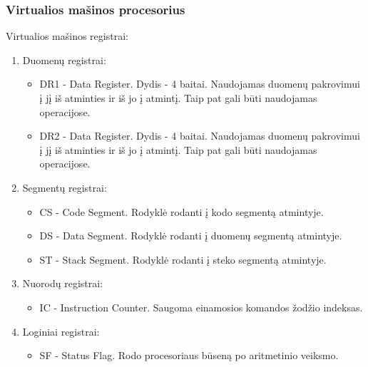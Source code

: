 	\subsubsection{Virtualios mašinos procesorius}
	Virtualios mašinos registrai:
	\begin{enumerate}
	\item Duomenų registrai: 
		\begin{itemize}
		\item DR1 - Data Register. Dydis - 4 baitai. Naudojamas duomenų pakrovimui į jį iš atminties ir iš jo į atmintį. Taip pat gali būti naudojamas operacijose.
		\item DR2 - Data Register. Dydis - 4 baitai. Naudojamas duomenų pakrovimui į jį iš atminties ir iš jo į atmintį. Taip pat gali būti naudojamas operacijose.
		\end{itemize}
	\item Segmentų registrai:
		\begin{itemize}
		\item CS - Code Segment. Rodyklė rodanti į kodo segmentą atmintyje.
		\item DS - Data Segment. Rodyklė rodanti į duomenų segmentą atmintyje.
		\item ST - Stack Segment. Rodyklė rodanti į steko segmentą atmintyje.
		\end{itemize}
	\item Nuorodų registrai:
		\begin{itemize}
		\item IC - Instruction Counter. Saugoma einamosios komandos žodžio indeksas.
		\end{itemize}
	\item Loginiai registrai:
		\begin{itemize}
		\item SF - Status Flag. Rodo procesoriaus būseną po aritmetinio veiksmo.
		\end{itemize}
	\end{enumerate}
